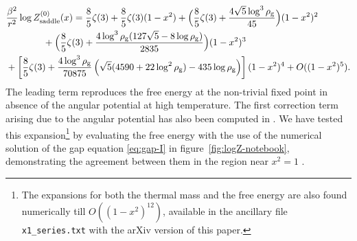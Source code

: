 \documentclass[a4paper,11pt]{article}
\newcommand{\appref}[1]{appendix~\ref{#1}}
\newcommand{\figref}[1]{figure~\ref{#1}}
\newcommand{\Order}{\mathcal O}
\begin{document}
%
%
\begin{align}
 &\frac{\beta^2}{r^2}\log Z_{\rm saddle}^{(0)}(x)
 =\frac85\zeta(3)+\frac85\zeta(3)(1-x^2)
+\Big(\frac85\zeta(3)
 +\frac{4\sqrt5\log^3\rho_{\rm g}}{45}\Big)(1-x^2)^2
 \nonumber\\
 &\qquad\qquad+\Big(\frac85\zeta(3)
 +\frac{4\log^3\rho_{\rm g}(127\sqrt5-8\log\rho_{\rm g})}{2835}\Big)
 (1-x^2)^3
 \nonumber\\
 &+\left[\frac85\zeta(3)
 +\frac{4\log^3\rho_{\rm g}}{70875}
 \left(\sqrt5(4590+22\log^2\rho_{\rm g})
 -435\log\rho_{\rm g}\right)\right]
 (1-x^2)^4
 +O((1-x^2)^5).
 \label{eq:F-x1-final}
\end{align}
The leading term reproduces the free energy at the non-trivial fixed point in absence of the angular potential at high temperature.  The first correction term arising due to the angular potential has also been computed in  \cite{Mauro:2026zus}. We have tested this expansion\footnote{
	The expansions for both the thermal mass and the free energy are also found numerically till $O((1-x^2)^{12})$, available in the ancillary file \texttt{x1\_series.txt} with the arXiv version of this paper.} by evaluating the free energy  with the use of the numerical solution of the gap equation \eqref{eq:gap-I} in \figref{fig:logZ-notebook}, demonstrating the agreement between them in the region near $x^2=1$
.
\end{document}
